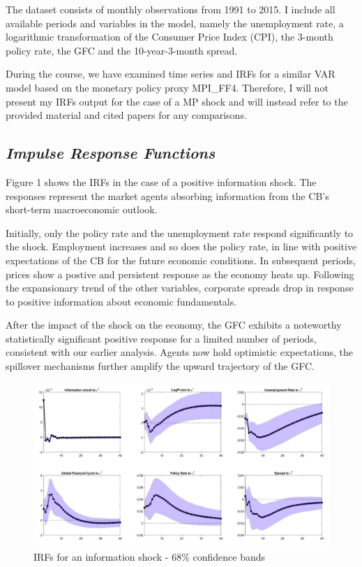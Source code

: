\documentclass[11pt,a4paper]{article}
\begin{document}
The dataset consists of monthly observations from 1991 to 2015. I include all available periods and variables in the model, namely the unemployment rate, a logarithmic transformation of the Consumer Price Index (CPI), the 3-month policy rate, the GFC and the 10-year-3-month spread.

During the course, we have examined time series and IRFs for a similar VAR model based on the monetary policy proxy MPI\_FF4. Therefore, I will not present my IRFs output for the case of a MP shock and will instead refer to the provided material and cited papers for any comparisons.

\subsection{\textit{Impulse Response Functions}}
Figure 1 shows the IRFs in the case of a positive information shock. The responses represent the market agents absorbing information from the CB's short-term macroeconomic outlook.

Initially, only the policy rate and the unemployment rate respond significantly to the shock. 
Employment increases and so does the policy rate, in line with positive expectations of the CB for the future economic conditions. 
In subsequent periods, prices show a postive and persistent response as the economy heats up. 
Following the expansionary trend of the other variables, corporate spreads drop in response to positive information about economic fundamentals. 

After the impact of the shock on the economy, the GFC exhibits a noteworthy statistically significant positive response for a limited number of periods, consistent with our earlier analysis. Agents now hold optimistic expectations, the spillover mechanisms further amplify the upward trajectory of the GFC.


    \begin{figure}
        \centering
        \includegraphics[scale=.39]{Graphs/IRF68_3lags.jpeg}
        \caption{IRFs for an information shock - 68\% confidence bands}
        \label{fig:IRF68}
    \end{figure}
\end{document}

